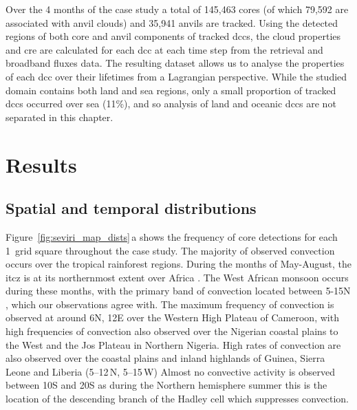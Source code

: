 Over the 4 months of the case study a total of 145,463 cores (of which 79,592 are associated with anvil clouds) and 35,941 anvils are tracked. 
Using the detected regions of both core and anvil components of tracked \acrshort{dcc}s, the cloud properties and \acrshort{cre} are calculated for each \acrshort{dcc} at each time step from the retrieval and broadband fluxes data. 
The resulting dataset allows us to analyse the properties of each \acrshort{dcc} over their lifetimes from a Lagrangian perspective.
While the studied domain contains both land and sea regions, only a small proportion of tracked \acrshort{dcc}s occurred over sea (11\%), and so analysis of land and oceanic \acrshort{dcc}s are not separated in this chapter.

\section{Results}

\subsection{Spatial and temporal distributions}

Figure~\ref{fig:seviri_map_dists}\,a shows the frequency of core detections for each 1\textdegree\ grid square throughout the case study. 
The majority of observed convection occurs over the tropical rainforest regions. 
During the months of May-August, the \acrfull{itcz} is at its northernmost extent over Africa \citep{nicholson_itcz_2018}. 
The West African monsoon occurs during these months, with the primary band of convection located between 5-15\textdegree N \citep{nicholson_revised_2009}, which our observations agree with. 
The maximum frequency of convection is observed at around 6\textdegree N, 12\textdegree E over the Western High Plateau of Cameroon, with high frequencies of convection also observed over the Nigerian coastal plains to the West and the Jos Plateau in Northern Nigeria. 
High rates of convection are also observed over the coastal plains and inland highlands of Guinea, Sierra Leone and Liberia (5--12\,\textdegree N, 5--15\,\textdegree W)
Almost no convective activity is observed between 10\textdegree S and 20\textdegree S as during the Northern hemisphere summer this is the location of the descending branch of the Hadley cell which suppresses convection.


